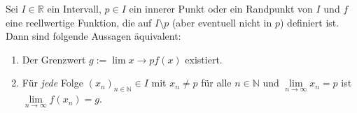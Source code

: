 Sei $I \in \mathbb{R}$ ein Intervall, $p \in I$ ein innerer Punkt oder ein Randpunkt von $I$ und $f$ eine reellwertige Funktion, die auf $I \setminus {p}$ (aber eventuell nicht in $p$) definiert ist. Dann sind folgende Aussagen äquivalent:
\begin{enumerate}
    \item Der Grenzwert $g := \lim\limits{x \to p} f(x)$ existiert.
    \item Für \textit{jede} Folge $(x_n)_{n \in \mathbb{N}} \in I$ mit $x_n \neq p$ für alle $n \in \mathbb{N}$ und $\lim\limits_{n \to \infty} x_n = p$ ist $\lim\limits_{n \to \infty} f(x_n) = g$.
\end{enumerate}